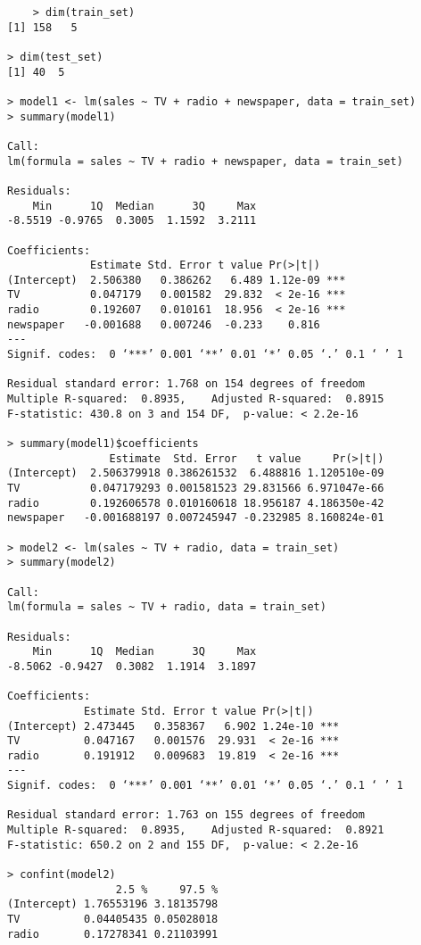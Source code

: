 \documentclass{article}
\begin{document}
\begin{verbatim}
    > dim(train_set)
[1] 158   5

> dim(test_set)
[1] 40  5

> model1 <- lm(sales ~ TV + radio + newspaper, data = train_set)
> summary(model1)

Call:
lm(formula = sales ~ TV + radio + newspaper, data = train_set)

Residuals:
    Min      1Q  Median      3Q     Max 
-8.5519 -0.9765  0.3005  1.1592  3.2111 

Coefficients:
             Estimate Std. Error t value Pr(>|t|)    
(Intercept)  2.506380   0.386262   6.489 1.12e-09 ***
TV           0.047179   0.001582  29.832  < 2e-16 ***
radio        0.192607   0.010161  18.956  < 2e-16 ***
newspaper   -0.001688   0.007246  -0.233    0.816    
---
Signif. codes:  0 ‘***’ 0.001 ‘**’ 0.01 ‘*’ 0.05 ‘.’ 0.1 ‘ ’ 1

Residual standard error: 1.768 on 154 degrees of freedom
Multiple R-squared:  0.8935,	Adjusted R-squared:  0.8915 
F-statistic: 430.8 on 3 and 154 DF,  p-value: < 2.2e-16

> summary(model1)$coefficients
                Estimate  Std. Error   t value     Pr(>|t|)
(Intercept)  2.506379918 0.386261532  6.488816 1.120510e-09
TV           0.047179293 0.001581523 29.831566 6.971047e-66
radio        0.192606578 0.010160618 18.956187 4.186350e-42
newspaper   -0.001688197 0.007245947 -0.232985 8.160824e-01

> model2 <- lm(sales ~ TV + radio, data = train_set)
> summary(model2)

Call:
lm(formula = sales ~ TV + radio, data = train_set)

Residuals:
    Min      1Q  Median      3Q     Max 
-8.5062 -0.9427  0.3082  1.1914  3.1897 

Coefficients:
            Estimate Std. Error t value Pr(>|t|)    
(Intercept) 2.473445   0.358367   6.902 1.24e-10 ***
TV          0.047167   0.001576  29.931  < 2e-16 ***
radio       0.191912   0.009683  19.819  < 2e-16 ***
---
Signif. codes:  0 ‘***’ 0.001 ‘**’ 0.01 ‘*’ 0.05 ‘.’ 0.1 ‘ ’ 1

Residual standard error: 1.763 on 155 degrees of freedom
Multiple R-squared:  0.8935,	Adjusted R-squared:  0.8921 
F-statistic: 650.2 on 2 and 155 DF,  p-value: < 2.2e-16

> confint(model2)
                 2.5 %     97.5 %
(Intercept) 1.76553196 3.18135798
TV          0.04405435 0.05028018
radio       0.17278341 0.21103991


\end{verbatim}
\end{document}
